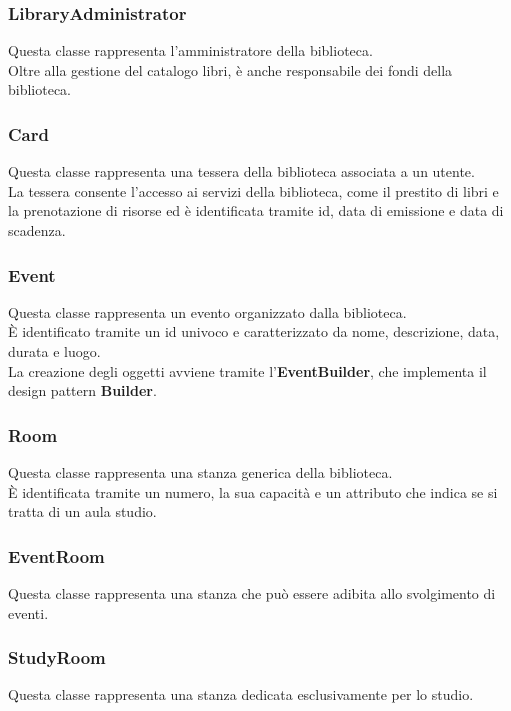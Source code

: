     \subsubsection{LibraryAdministrator}
    Questa classe rappresenta l'amministratore della biblioteca.\\
    Oltre alla gestione del catalogo libri, è anche responsabile dei fondi della biblioteca.
    
    \subsubsection{Card}
    Questa classe rappresenta una tessera della biblioteca associata a un utente.\\
    La tessera consente l'accesso ai servizi della biblioteca, come il prestito di libri e la prenotazione di risorse ed è identificata tramite id, data di emissione e data di scadenza.\\
    
    \subsubsection{Event}
    Questa classe rappresenta un evento organizzato dalla biblioteca.\\
    È identificato tramite un id univoco e caratterizzato da nome, descrizione, data, durata e luogo.\\
    La creazione degli oggetti avviene tramite l'\textbf{EventBuilder}, che implementa il design pattern \textbf{Builder}.\\

    \subsubsection{Room}
    Questa classe rappresenta una stanza generica della biblioteca.\\
    È identificata tramite un numero, la sua capacità e un attributo che indica se si tratta di un aula studio.\\
    
    \subsubsection{EventRoom}
    Questa classe rappresenta una stanza che può essere adibita allo svolgimento di eventi.\\
    
    \subsubsection{StudyRoom}
    Questa classe rappresenta una stanza dedicata esclusivamente per lo studio.\\
    


